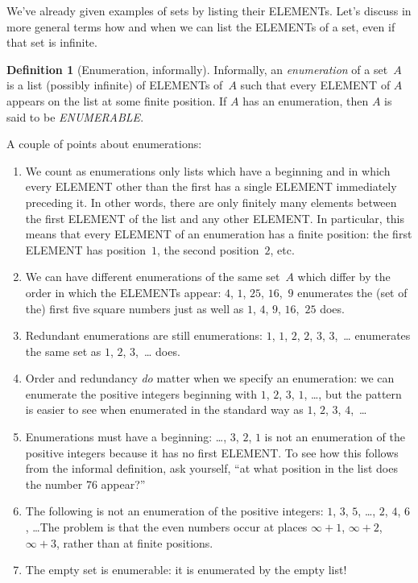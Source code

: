 \documentclass[10pt,a4paper]{article}
\newcommand*{\olup}[1]{\MakeUppercase{#1}}
\theoremstyle{plain}
\theoremstyle{definition}
\newtheorem{defn}[thm]{Definition}
\theoremstyle{remark}
\newenvironment{explain}{}{}
\begin{document}
\begin{explain}
We've already given examples of sets by listing their \olup{element}s.
Let's discuss in more general terms how and when we can list the
\olup{element}s of a set, even if that set is infinite.
\end{explain}

\begin{defn}[Enumeration, informally]
Informally, an \emph{enumeration} of a set~$A$ is a list (possibly
infinite) of \olup{element}s of~$A$ such that every \olup{element} of $A$
appears on the list at some finite position. If $A$ has an
enumeration, then $A$ is said to be \emph{\olup{enumerable}}.
\end{defn}

\begin{explain}
A couple of points about enumerations:
\begin{enumerate}
\item We count as enumerations only lists which have a beginning and
  in which every \olup{element} other than the first has a single
  \olup{element} immediately preceding it.  In other words, there are
  only finitely many elements between the first \olup{element} of the
  list and any other \olup{element}. In particular, this means that every
  \olup{element} of an enumeration has a finite position: the first
  \olup{element} has position~$1$, the second position~$2$, etc.
\item We can have different enumerations of the same set~$A$ which
  differ by the order in which the \olup{element}s appear: $4$, $1$,
  $25$, $16$,~$9$ enumerates the (set of the) first five square
  numbers just as well as $1$, $4$, $9$, $16$,~$25$ does.
\item Redundant enumerations are still enumerations: $1$, $1$, $2$,
  $2$, $3$, $3$,~\dots{} enumerates the same set as $1$, $2$,
  $3$,~\dots{} does.
\item Order and redundancy \emph{do} matter when we specify an
  enumeration: we can enumerate the positive integers beginning with
  $1$, $2$, $3$, $1$, \dots{}, but the pattern is easier to see when
  enumerated in the standard way as $1$, $2$, $3$, $4$,~\dots
\item Enumerations must have a beginning: \dots, $3$, $2$, $1$ is not
  an enumeration of the positive integers because it has no first
  \olup{element}. To see how this follows from the informal definition,
  ask yourself, ``at what position in the list does the number 76
  appear?''
\item The following is not an enumeration of the positive integers:
  $1$, $3$, $5$, \dots, $2$, $4$, $6$, \dots\@ The problem is that the
  even numbers occur at places $\infty + 1$, $\infty + 2$, $\infty +
  3$, rather than at finite positions.
\item The empty set is enumerable: it is enumerated by the empty list!{}
\end{enumerate}
\end{explain}
\end{document}
